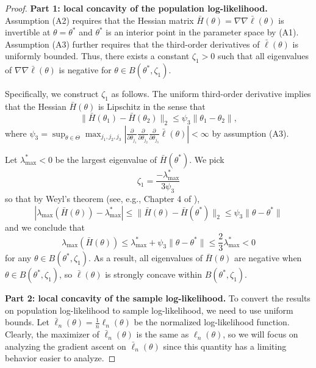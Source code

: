 \documentclass[aos, preprint]{imsart}
\theoremstyle{plain}
\theoremstyle{definition}
\begin{document}
\begin{appendix}
\begin{proof}

{\bf Part 1: local concavity of the population log-likelihood.}
Assumption (A2) requires that the Hessian matrix $\bar H(\theta) = \nabla \nabla \bar \ell(\theta)$
is invertible at $\theta =\theta^*$ and $\theta^*$ is an interior point in the parameter space by (A1).
Assumption (A3) further requires that the third-order derivatives of $\bar \ell(\theta)$
is uniformly bounded.
Thus, there exists a constant $\zeta_1>0$ such that all eigenvalues of 
$\nabla\nabla\bar \ell(\theta)$ is 
negative for $\theta \in B(\theta^*, \zeta_1)$. 

Specifically, we  construct $\zeta_1$  as follows. The uniform third-order derivative implies
that the Hessian $ \bar H(\theta)$ is Lipschitz in the sense that 
$$
\| \bar H(\theta_1) - \bar H(\theta_2)\|_{2} \leq \psi_3 \|\theta_1-\theta_2\|,
$$
where $\psi_3 = \sup_{\theta\in\Theta} \max_{j_1,j_2,j_3}\left|\frac{\partial}{\partial \theta_{j_1}}\frac{\partial}{\partial \theta_{j_2}}\frac{\partial}{\partial \theta_{j_3}}\bar \ell(\theta)\right|<\infty$
by assumption (A3).

Let $\lambda^*_{\max}<0$ be the largest eigenvalue of $ \bar H(\theta^*)$. 
We pick 
$$
\zeta_1 = \frac{-\lambda^*_{\max}}{3 \psi_3}
$$
so that by Weyl's theorem (see, e.g., Chapter 4 of \citealt{horn2012matrix}), 
$$
|\lambda_{\max}(\bar H(\theta)) - \lambda^*_{\max}|\leq \| \bar H(\theta) - \bar H(\theta^*)\|_2 \leq \psi_3 \|\theta-\theta^*\|
$$
and we conclude that 
\begin{equation}
\lambda_{\max}(\bar H(\theta)) \leq \lambda^*_{\max} + \psi_3 \|\theta-\theta^*\| \leq \frac{2}{3} \lambda^*_{\max}<0 
\label{eq::GA::pf1}
\end{equation}
for any $\theta \in B(\theta^*, \zeta_1)$.
As a result, all eigenvalues of $\bar H(\theta)$ are negative when $\theta \in B(\theta^*, \zeta_1)$,
so $\bar \ell(\theta)$ is strongly concave within $B(\theta^*, \zeta_1)$.


{\bf Part 2: local concavity of the sample log-likelihood.}
To convert the results on population log-likelihood to sample log-likelihood,
we need to use uniform bounds. 
Let $\bar \ell_n(\theta) = \frac{1}{n}\ell_n(\theta)$ be the normalized log-likelihood function.
Clearly, the maximizer of $\bar \ell_n(\theta)$ is the same as $ \ell_n(\theta)$,
so we will focus on analyzing the gradient ascent on $\bar \ell_n(\theta)$ 
since this quantity has a  limiting behavior easier to analyze.


\end{proof}
\end{appendix}
\end{document}
